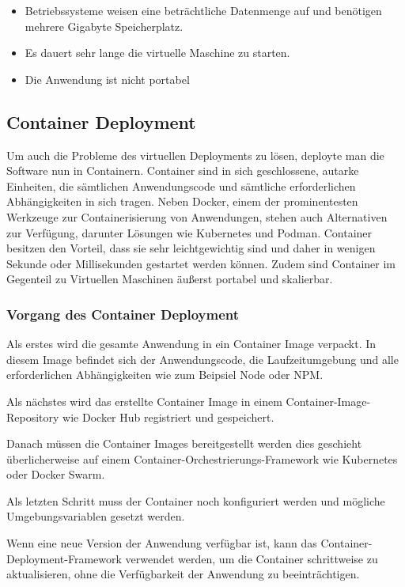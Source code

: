 \begin{itemize}
\item Betriebssysteme weisen eine beträchtliche Datenmenge auf und benötigen mehrere Gigabyte Speicherplatz.
\item Es dauert sehr lange die virtuelle Maschine zu starten.
\item  Die Anwendung ist nicht portabel
\end{itemize}

\cite{Virtuelles_Deployment}

\subsection{Container Deployment}
Um auch die Probleme des virtuellen Deployments zu lösen, deployte man die Software nun in Containern.
Container sind in sich geschlossene, autarke Einheiten, die sämtlichen Anwendungscode und sämtliche erforderlichen Abhängigkeiten in sich tragen. Neben Docker, einem der prominentesten Werkzeuge zur Containerisierung von Anwendungen, stehen auch Alternativen zur Verfügung, darunter Lösungen wie Kubernetes und Podman. Container besitzen den Vorteil, dass sie sehr leichtgewichtig sind und daher in wenigen Sekunde oder Millisekunden gestartet werden können. Zudem sind Container im Gegenteil zu Virtuellen Maschinen äußerst portabel und skalierbar.



\subsubsection{Vorgang des Container Deployment}

Als erstes wird die gesamte Anwendung in ein Container Image verpackt. In diesem Image befindet sich der Anwendungscode, die Laufzeitumgebung und alle erforderlichen Abhängigkeiten wie zum Beipsiel Node oder NPM.

Als nächstes wird das erstellte Container Image in einem Container-Image-Repository wie Docker Hub registriert und gespeichert.

Danach müssen die Container Images bereitgestellt werden dies geschieht überlicherweise auf einem Container-Orchestrierungs-Framework wie Kubernetes oder Docker Swarm.

Als letzten Schritt muss der Container noch konfiguriert werden und mögliche Umgebungsvariablen gesetzt werden.

Wenn eine neue Version der Anwendung verfügbar ist, kann das Container-Deployment-Framework verwendet werden, um die Container schrittweise zu aktualisieren, ohne die Verfügbarkeit der Anwendung zu beeinträchtigen.


